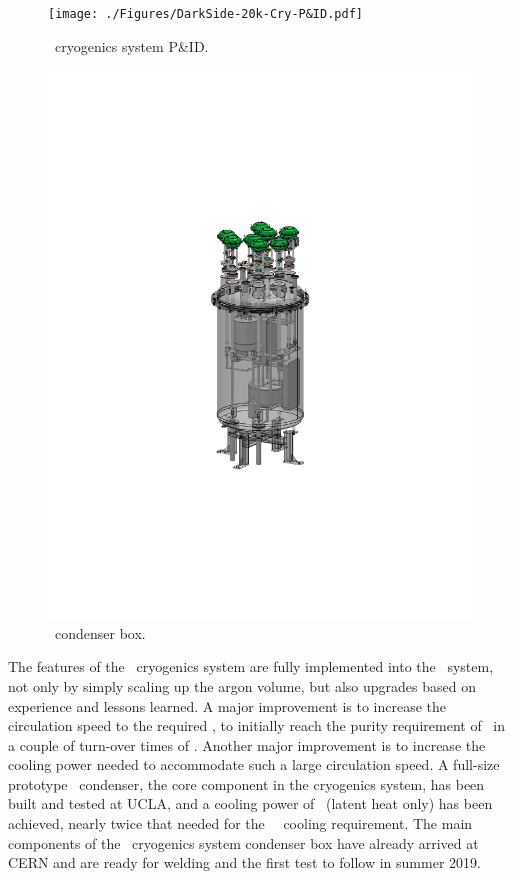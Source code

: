 \begin{figure}[!t]
\texttt{[image: ./Figures/DarkSide-20k-Cry-P\&ID.pdf]}
\caption[\DSks\ cryogenics system P\&ID]{\DSks\ cryogenics system P\&ID.}
\label{fig:DSCryo}
\end{figure}

\begin{figure}[!t]
\includegraphics[height=0.95\textheight]{./Figures/DSk-UArCryogenics.PDF}
\caption[\DSks\ condenser box]{\DSks\ condenser box.}
\label{fig:DSCondenser}
\end{figure}

The features of the \DSfs\ cryogenics system are fully implemented into the \DSks\ system, not only by simply scaling up the argon volume, but also upgrades based on experience and lessons learned.  A major improvement is to increase the circulation speed to the required \DSkCryogenicsGasFlowTotal, to initially reach the purity requirement of \LAr\ in a couple of turn-over times of \DSkUArTurnOverTime.  Another major improvement is to increase the cooling power needed to accommodate such a large circulation speed.  A full-size prototype \LAr\ condenser, the core component in the cryogenics system, has been built and tested at UCLA, and a cooling power of \DSkCryogenicsCondenserCoolingPowerMaxTested\ (latent heat only) has been achieved, nearly twice that needed for the \DSks\ \UAr\ cooling requirement.  The main components of the \UAr\ cryogenics system condenser box have already arrived at CERN and are ready for welding and the first test to follow in summer 2019.   

